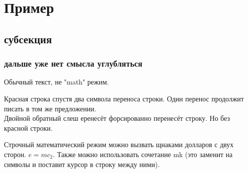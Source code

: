 \section{Пример}
\subsection{субсекция}
\subsubsection{дальше уже нет смысла углубляться}

Обычный текст, не "math" режим. 

Красная строка спустя два символа переноса строки.
Один перенос продолжит писать в том же предложении.
\\ Двойной обратный слеш еренесёт форсированно перенесёт строку.
Но без красной строки.

Строчный математический режим можно вызвать щнаками долларов с двух сторон. $ e=mc_{ 2}$.
Также можно использовать сочетание mk (это заменит на символы и поставит курсор в строку между ними).

